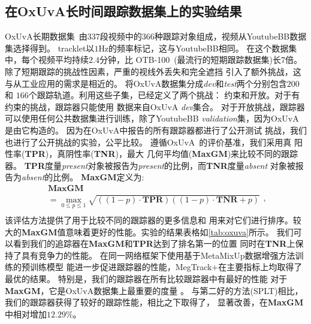 \documentclass[promaster]{thesis-uestc}
\begin{document}
\subsection{在OxUvA长时间跟踪数据集上的实验结果}
OxUvA长期数据集~\cite{OxUvA}由$337$段视频中的$366$种跟踪对象组成，视频从YoutubeBB数据集选择得到。
tracklet以$1$Hz的频率标记，这与YoutubeBB相同。
在这个数据集中，每个视频平均持续$2.4$分钟，比
OTB-100~\cite{OTB15}(最流行的短期跟踪数据集)长7倍。
除了短期跟踪的挑战性因素，严重的视线外丢失和完全遮挡
引入了额外挑战，这与从工业应用的需求是相近的。
将OxUvA数据集分成\emph{dev}和\emph{test}两个分别包含$200$和
$166$个跟踪轨道。利用这些子集，已经定义了两个挑战：
约束和开放。对于有约束的挑战，跟踪器只能使用
数据来自OxUvA \emph{dev}集合。
对于开放挑战，跟踪器可以使用任何公共数据集进行训练，除了YoutubeBB \emph{validation}集，因为OxUvA是由它构造的。
因为在OxUvA\cite{OxUvA}中报告的所有跟踪器都进行了公开测试
挑战，我们也进行了公开挑战的实验，公平比较。
遵循OxUvA~\cite{OxUvA}的评价基准，我们采用真
阳性率(\textbf{TPR})，真阴性率(\textbf{TNR})，最大
几何平均值(\textbf{MaxGM})来比较不同的跟踪器。
\textbf{TPR}度量\emph{present}对象被报告为\emph{present}的比例，而\textbf{TNR}度量\emph{absent}
对象被报告为\emph{absent}的比例。
\textbf{MaxGM}定义为:
\begin{equation}
    \label{MaxGM}
    \begin{array}{l}
    \mathbf{MaxGM} \\ 
    = \mathop {\max }\limits_{0 \le p \le 1} \sqrt {((1 - p) \cdot \mathbf{TPR})
    ((1 - p) \cdot \mathbf{TNR} + p)}\\ 
    \end{array}, 
\end{equation}
该评估方法提供了用于比较不同的跟踪器的更多信息和
用来对它们进行排序。较大的\textbf{MaxGM}值意味着更好的性能。实验的结果表格如\ref{tab:oxuva}所示。
我们可以看到我们的追踪器在\textbf{MaxGM}和\textbf{TPR}达到了排名第一的位置
同时在\textbf{TNR}上保持了具有竞争力的性能。
在同一网络框架下使用基于MetaMixUp数据增强方法训练的预训练模型
能进一步促进跟踪器的性能，MegTrack+在主要指标上均取得了最优的结果。
特别是，我们的跟踪器在所有比较跟踪器中有最好的性能
对于\textbf{MaxGM}，它是OxUvA数据集上最重要的度量
。
与第二好的方法(SPLT)相比，我们的跟踪器获得了较好的跟踪性能，相比之下取得了，
显著改善，在\textbf{MaxGM}中相对增加$12.29\%$。
\end{document}
